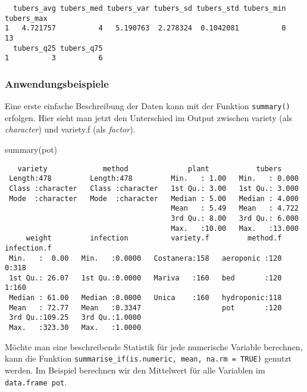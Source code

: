 \documentclass[
  letterpaper,
  DIV=11,
  numbers=noendperiod]{scrartcl}
\newenvironment{Shaded}{\begin{snugshade}}{\end{snugshade}}
\newcommand{\FunctionTok}[1]{\textcolor[rgb]{0.28,0.35,0.67}{#1}}
\newcommand{\NormalTok}[1]{\textcolor[rgb]{0.00,0.23,0.31}{#1}}
\begin{document}
\begin{verbatim}
  tubers_avg tubers_med tubers_var tubers_sd tubers_std tubers_min tubers_max
1   4.721757          4   5.190763  2.278324  0.1042081          0         13
  tubers_q25 tubers_q75
1          3          6
\end{verbatim}

\hypertarget{anwendungsbeispiele}{%
\subsubsection{Anwendungsbeispiele}\label{anwendungsbeispiele}}

Eine erste einfache Beschreibung der Daten kann mit der Funktion
\texttt{summary()} erfolgen. Hier sieht man jetzt den Unterschied im
Output zwischen variety (als \emph{character}) und variety.f (als
\emph{factor}).

\begin{Shaded}
\begin{Highlighting}[]
\FunctionTok{summary}\NormalTok{(pot)}
\end{Highlighting}
\end{Shaded}

\begin{verbatim}
   variety             method              plant           tubers      
 Length:478         Length:478         Min.   : 1.00   Min.   : 0.000  
 Class :character   Class :character   1st Qu.: 3.00   1st Qu.: 3.000  
 Mode  :character   Mode  :character   Median : 5.00   Median : 4.000  
                                       Mean   : 5.49   Mean   : 4.722  
                                       3rd Qu.: 8.00   3rd Qu.: 6.000  
                                       Max.   :10.00   Max.   :13.000  
     weight         infection          variety.f         method.f   infection.f
 Min.   :  0.00   Min.   :0.0000   Costanera:158   aeroponic :120   0:318      
 1st Qu.: 26.07   1st Qu.:0.0000   Mariva   :160   bed       :120   1:160      
 Median : 61.00   Median :0.0000   Unica    :160   hydroponic:118              
 Mean   : 72.77   Mean   :0.3347                   pot       :120              
 3rd Qu.:109.25   3rd Qu.:1.0000                                               
 Max.   :323.30   Max.   :1.0000                                               
\end{verbatim}

Möchte man eine beschreibende Statistik für jede numerische Variable
berechnen, kann die Funktion
\texttt{summarise\_if(is.numeric,\ mean,\ na.rm\ =\ TRUE)} genutzt
werden. Im Beispiel berechnen wir den Mittelwert für alle Variablen im
\texttt{data.frame\ pot}.
\end{document}
